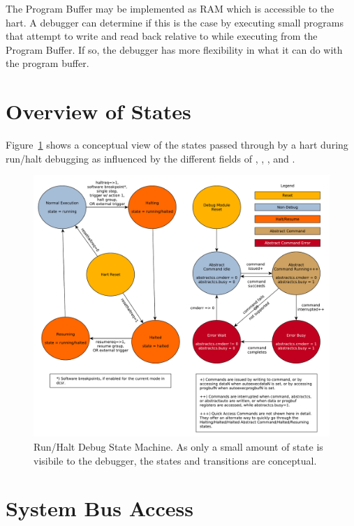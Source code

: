 The Program Buffer may be implemented as RAM which is accessible to the
hart. A debugger can determine if this is the case by executing small
programs that attempt to write and read back relative to \Rpc while executing
from the Program Buffer.
If so, the debugger has more flexibility in what it can do with the program buffer.

\section{Overview of States}

Figure~\ref{fig:abstract_sm} shows a conceptual view of the states
passed through by a hart during run/halt debugging as influenced
by the different fields of \Rdmcontrol, \Rabstractcs, \Rabstractauto, and
\Rcommand.

\begin{figure}
   \centering
   \includegraphics[width=\textwidth]{fig/abstract_commands.pdf}
   \caption[Run/Halt Debug State Machine]{Run/Halt Debug State Machine.
     As only a small amount of state is visibile to the debugger,
     the states and transitions are conceptual.}
   \label{fig:abstract_sm}
\end{figure}

\section{System Bus Access} \label{systembusaccess}

